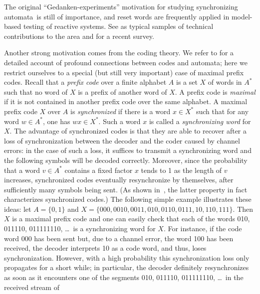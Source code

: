 \documentclass{irmaart}
\newcommand{\sa}{synchronizing au\-tom\-a\-ta}
\theoremstyle{plain}
\begin{document}
The original ``Gedanken-experiments'' motivation for studying \sa\
is still of importance, and reset words are frequently applied in
model-based testing of reactive systems. See \cite{Cho&Jeong&Somenzi&Pixley:1993,
Boppana&Rajan&Takayama&Fujita:1999} as typical samples of technical
contributions to the area and \cite{Sandberg:2005} for a recent survey.

Another strong motivation comes from the coding theory. We refer
to \cite[Chapters~3 and~10]{Berstel&Perrin&Reutenauer:2009} for a
detailed account of profound connections between codes and
automata; here we restrict ourselves to a special (but still very
important) case of maximal prefix codes. Recall that a
\emph{prefix code} over a finite alphabet $A$
is a set $X$ of words in $A^*$ such that no word of $X$ is a
prefix of another word of $X$. A prefix code is
\emph{maximal} if it is not contained
in another prefix code over the same alphabet. A maximal prefix
code $X$ over $A$ is \emph{synchronized} if there is a word $x\in X^*$ such that for any
word $w\in A^*$, one has $wx\in X^*$. Such a word $x$ is called a
\emph{synchronizing word}\index{synchronizing word of a code} for
$X$. The advantage of synchronized codes is that they are able to
recover after a loss of synchronization between the decoder and
the coder caused by channel errors: in the case of such a loss, it
suffices to transmit a synchronizing word and the following
symbols will be decoded correctly. Moreover, since the probability
that a word $v\in A^*$ contains a fixed factor $x$ tends to 1 as
the length of $v$ increases, synchronized codes eventually
resynchronize by themselves, after sufficiently many symbols being
sent. (As shown in~\cite{Capocelli&Gargano&Vaccaro:1988}, the
latter property in fact characterizes synchronized codes.) The
following simple example illustrates these ideas: let $A=\{0,1\}$
and $X=\{000,0010,0011,010,0110,0111,10,110,111\}$. Then $X$ is a
maximal prefix code and one can easily check that each of the
words 010, 011110, 011111110, \dots\ is a synchronizing word for
$X$. For instance, if the code word 000 has been sent but, due to
a channel error, the word 100 has been received, the decoder
interprets 10 as a code word, and thus, loses synchronization.
However, with a high probability this synchronization loss only
propagates for a short while; in particular, the decoder
definitely resynchronizes as soon as it encounters one of the
segments 010, 011110, 011111110, \dots\ in the received stream of
\end{document}
